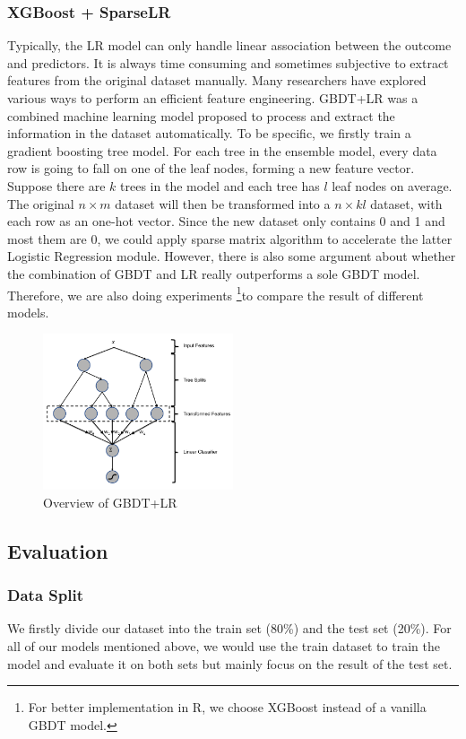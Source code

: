 \documentclass[11pt]{article}
\begin{document}
\subsubsection{XGBoost + SparseLR}
Typically, the LR model can only handle linear association between the outcome and predictors. It is always time consuming and sometimes subjective to extract features from the original dataset manually. Many researchers have explored various ways to perform an efficient feature engineering. GBDT+LR\citep{gbdtlr} was a combined machine learning model proposed to process and extract the information in the dataset automatically. To be specific, we firstly train a gradient boosting tree model. For each tree in the ensemble model, every data row is going to fall on one of the leaf nodes, forming a new feature vector. Suppose there are $k$ trees in the model and each tree has $l$ leaf nodes on average. The original $n\times m$ dataset will then be transformed into a $n\times kl$ dataset, with each row as an one-hot vector. Since the new dataset only contains 0 and 1 and most them are 0, we could apply sparse matrix algorithm to accelerate the latter Logistic Regression module. However, there is also some argument about whether the combination of GBDT and LR really outperforms a sole GBDT model. Therefore, we are also doing experiments \footnote{For better implementation in R, we choose XGBoost instead of a vanilla GBDT model.}to compare the result of different models.
\begin{figure}
\centering
\includegraphics[width=0.5\textwidth]{gbdtlr.png}
\caption{Overview of GBDT+LR \citep{gbdtlr}}
\label{fig:gbdtlr}
\end{figure}

\subsection{Evaluation}
\subsubsection{Data Split}
We firstly divide our dataset into the train set (80\%) and the test set (20\%). For all of our models mentioned above, we would use the train dataset to train the model and evaluate it on both sets but mainly focus on the result of the test set.
\end{document}
